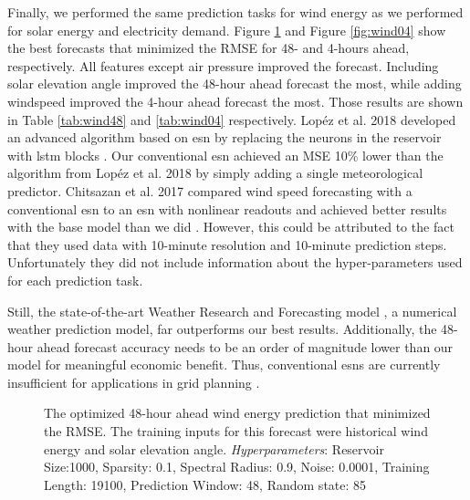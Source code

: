 Finally, we performed the same prediction tasks for wind energy as we performed for solar energy and electricity demand.
Figure \ref{fig:wind48} and Figure \ref{fig:wind04} show the best forecasts
that minimized the RMSE for
48- and 4-hours ahead, respectively. All features except air pressure improved
the forecast. Including solar elevation angle improved the 48-hour ahead
forecast the most, while adding windspeed improved the 4-hour ahead forecast
the most. Those results are shown in Table \ref{tab:wind48} and \ref{tab:wind04}
respectively. Lop\'ez et al. 2018 developed an advanced algorithm based on
\gls{esn} by replacing the neurons in the reservoir with \gls{lstm} blocks \cite{lopez_wind_2018}. Our conventional \gls{esn} achieved
an MSE 10\% lower than the algorithm from Lop\'ez et al. 2018 by simply adding a
single meteorological predictor.
Chitsazan et al. 2017 \cite{chitsazan_wind_2017} compared wind speed
forecasting with a conventional \gls{esn} to an \gls{esn} with nonlinear
readouts and achieved better results with the base model than we did
\cite{chitsazan_wind_2017}. However, this could be attributed to the fact that
they used data with 10-minute resolution and 10-minute prediction steps.
Unfortunately they did not include information about the hyper-parameters used
for each prediction task.

Still, the state-of-the-art Weather Research and Forecasting model
\cite{powers_weather_2017}, a numerical weather prediction model, far
outperforms our best results. Additionally, the 48-hour ahead forecast accuracy
needs to be an order of magnitude lower than our model for meaningful economic
benefit. Thus, conventional \glspl{esn} are currently insufficient for
applications in grid planning \cite{wang_quantifying_2016}.

\begin{figure}[H]
  \centering
  \resizebox{\columnwidth}{!}{}
  \caption{The optimized 48-hour ahead wind energy prediction that minimized
  the RMSE. The training inputs for this forecast were historical wind energy and solar elevation
  angle. \textit{Hyperparameters}: Reservoir Size:1000, Sparsity: 0.1, Spectral
  Radius: 0.9, Noise: 0.0001, Training Length: 19100, Prediction Window: 48,
  Random state: 85}
  \label{fig:wind48}
\end{figure}

